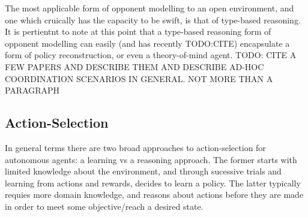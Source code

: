 \newline \newline
The most applicable form of opponent modelling to an open environment, and one which cruically has the capacity to be swift, is that of type-based reasoning. It is pertientnt to note at this point that a type-based reasoning form of opponent modelling can easily (and has recently TODO:CITE) encapsulate a form of policy reconstruction, or even a theory-of-mind agent.
\newline \newline
TODO: CITE A FEW PAPERS AND DESCRIBE THEM AND DESCRIBE AD-HOC COORDINATION SCENARIOS IN GENERAL. NOT MORE THAN A PARAGRAPH


\subsection{Action-Selection}
In general terms there are two broad approaches to action-selection for autonomous agents: a learning vs a reasoning approach. The former starts with limited knowledge about the environment, and through sucessive trials and learning from actions and rewards, decides to learn a policy. The latter typically requies more domain knowledge, and reasons about actions before they are made in order to meet some objective/reach a desired state. 
